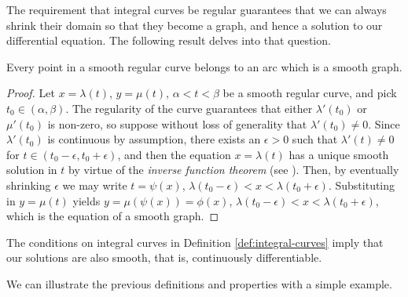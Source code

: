 The requirement that integral curves be regular guarantees that we can always shrink their domain so that they become a graph, and hence a solution to our differential equation. The following result delves into that question.

\begin{prop}
  Every point in a smooth regular curve belongs to an arc which is a smooth graph.
\end{prop}

\begin{proof}
  Let $x=\lambda(t)$, $y=\mu(t)$, $\alpha < t < \beta$ be a smooth regular curve, and pick $t_0 \in (\alpha, \beta)$. The regularity of the curve guarantees that either $\lambda'(t_0)$ or $\mu'(t_0)$ is non-zero, so suppose without loss of generality that $\lambda'(t_0) \neq 0$. Since $\lambda'(t_0)$ is continuous by assumption, there exists an $\epsilon > 0$ such that $\lambda'(t)\neq 0$ for $t \in (t_0 - \epsilon, t_0 + \epsilon)$, and then the equation $x=\lambda(t)$ has a unique smooth solution in $t$ by virtue of the \textit{inverse function theorem} (see \cite[372]{apostol1974analysis}). Then, by eventually shrinking $\epsilon$ we may write $t=\psi(x)$, $\lambda(t_0 - \epsilon) < x < \lambda(t_0 + \epsilon)$. Substituting in $y=\mu(t)$ yields $y=\mu(\psi(x)) = \phi(x)$, $\lambda(t_0 - \epsilon) < x < \lambda(t_0 + \epsilon)$, which is the equation of a smooth graph.
\end{proof}

\begin{remark} The conditions on integral curves in Definition \ref{def:integral-curves} imply that our solutions are also smooth, that is, continuously differentiable.
\end{remark}

We can illustrate the previous definitions and properties with a simple example.

